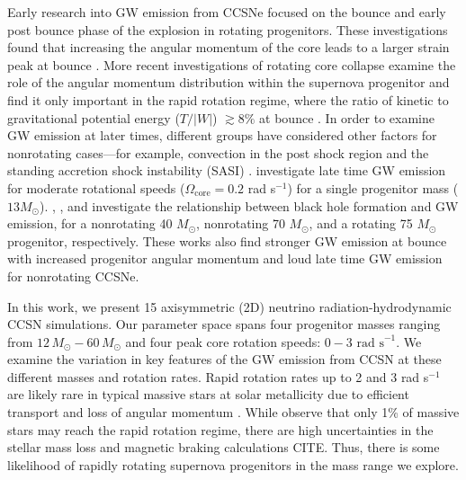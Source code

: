 \documentclass[twocolumn,times]{aastex62}  %
\begin{document}
Early research into GW emission from CCSNe focused on the bounce and early post bounce phase of the explosion in rotating progenitors.
These investigations found that increasing the angular momentum of the core leads to a larger strain peak at bounce \citep{muller:1982,moench:1991,yamada:1995,zwerger:1997,dimm:2002,kotake:2003,shibata:2004}.  
More recent investigations of rotating core collapse examine the role of the angular momentum distribution within the supernova progenitor and find it only important in the rapid rotation regime, where the ratio of kinetic to gravitational potential energy ($T/|W|$) $ \gtrsim 8\%$ at bounce \citep{abdik:2014}. In order to examine GW emission at later times, different groups have considered other factors for nonrotating cases---for example, convection in the post shock region \citep{burrows:1996,muller:1997,muller:2004,murphy:2009,marek:2009b} and the standing accretion shock instability (SASI) \citep{blondin:2003,blondin:2006,ohnishi:2006,foglizzo:2007,scheck:2008,iwakami:2009,fernandez:2010}.  \citet{moro:2018} investigate late time GW emission for moderate rotational speeds ($\Omega_{\mathrm{core}} = 0.2$ rad s$^{-1}$) for a single progenitor mass ($13 M_\odot$).  \citet{pan:2018}, \citet{kuroda:2018}, and \citet{ott:2011} investigate the relationship between black hole formation and GW emission, for a nonrotating 40 $M_\odot$, nonrotating  70 $M_\odot$, and  a rotating 75 $M_\odot$ progenitor, respectively.  These works also find stronger GW emission at bounce with increased progenitor angular momentum and loud late time GW emission for nonrotating CCSNe.
 

In this work, we present 15 axisymmetric (2D) neutrino radiation-hydrodynamic CCSN simulations.  
Our parameter space spans four progenitor masses ranging from $12\,M_\odot-60\,M_\odot$ \citep{Suk:2016} and four peak core rotation speeds: $0-3 \text{ rad s}^{-1}$.  
We examine the variation in key features of the GW emission from CCSN at these different masses and rotation rates.
Rapid rotation rates up to 2 and 3 rad s$^{-1}$ are likely rare in typical massive stars at solar metallicity due to efficient transport and loss of angular momentum \citep{heger:2005}.
While \citet{woosley:2006} observe that only 1\% of massive stars may reach the rapid rotation regime, there are high uncertainties in the stellar mass loss and magnetic braking calculations CITE.  Thus, there is some likelihood of rapidly rotating supernova progenitors in the mass range we explore.  

\end{document}
